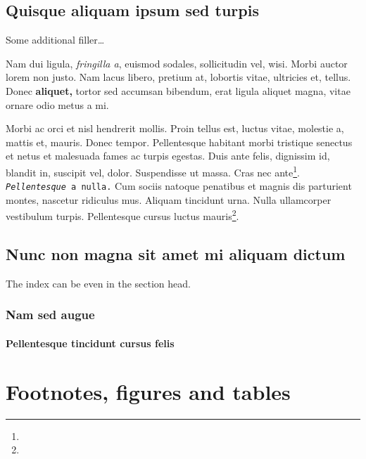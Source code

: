 \documentclass[cfonts,nofontsdir]{nostarch}
\begin{document}
\section{Quisque aliquam ipsum sed turpis}

Some additional filler\ldots


\lipsum[1]

Nam dui ligula, \emph{fringilla a}, euismod sodales,
sollicitudin vel, wisi.  Morbi auctor lorem non justo. Nam lacus
libero, pretium at, lobortis vitae, ultricies et, tellus.
Donec \textbf{aliquet,} tortor sed accumsan bibendum, erat
ligula aliquet magna, vitae ornare odio
metus a mi.

Morbi ac orci et nisl hendrerit mollis.  Proin tellus est, luctus
vitae, molestie a, mattis et, mauris. Donec tempor. Pellentesque
habitant morbi tristique senectus et netus et malesuada fames ac
turpis egestas. Duis ante felis, dignissim id, blandit in, suscipit
vel, dolor.  Suspendisse ut massa. Cras nec ante\footnote{\lipsum[4]}.
\texttt{{\itshape Pellentesque} a nulla.}  Cum sociis natoque
penatibus et magnis dis parturient montes, nascetur ridiculus mus.
Aliquam tincidunt urna.  Nulla ullamcorper vestibulum turpis.
Pellentesque cursus luctus mauris\footnote{\lipsum[3]}.

\lipsum[10]

\section{Nunc non magna sit amet mi aliquam dictum}

The index can be even in the section head.

\lipsum[32-33]

\subsection{Nam sed augue}

\lipsum[34-35]

\subsubsection{Pellentesque tincidunt cursus felis}

\lipsum[36-38]

\chapter{Footnotes, figures and tables}
\label{chap:proin}
\end{document}
